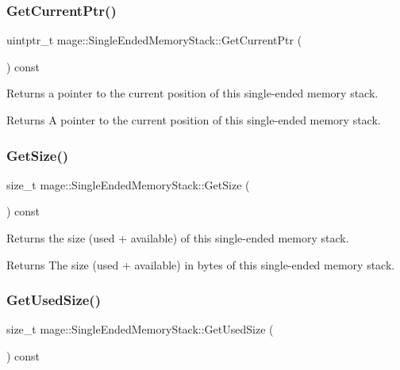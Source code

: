 \subsubsection{\texorpdfstring{Get\+Current\+Ptr()}{GetCurrentPtr()}}
{\footnotesize\ttfamily uintptr\+\_\+t mage\+::\+Single\+Ended\+Memory\+Stack\+::\+Get\+Current\+Ptr (\begin{DoxyParamCaption}{ }\end{DoxyParamCaption}) const\hspace{0.3cm}{\ttfamily [noexcept]}}

Returns a pointer to the current position of this single-\/ended memory stack.

\begin{DoxyReturn}{Returns}
A pointer to the current position of this single-\/ended memory stack. 
\end{DoxyReturn}
\hypertarget{classmage_1_1_single_ended_memory_stack_aa1df0adf194d6c2bb6c7597a96c10e61}{}\label{classmage_1_1_single_ended_memory_stack_aa1df0adf194d6c2bb6c7597a96c10e61} 
\subsubsection{\texorpdfstring{Get\+Size()}{GetSize()}}
{\footnotesize\ttfamily size\+\_\+t mage\+::\+Single\+Ended\+Memory\+Stack\+::\+Get\+Size (\begin{DoxyParamCaption}{ }\end{DoxyParamCaption}) const\hspace{0.3cm}{\ttfamily [noexcept]}}

Returns the size (used + available) of this single-\/ended memory stack.

\begin{DoxyReturn}{Returns}
The size (used + available) in bytes of this single-\/ended memory stack. 
\end{DoxyReturn}
\hypertarget{classmage_1_1_single_ended_memory_stack_ab2b07a4cf2c9eb9988ad49174e0804ac}{}\label{classmage_1_1_single_ended_memory_stack_ab2b07a4cf2c9eb9988ad49174e0804ac} 
\subsubsection{\texorpdfstring{Get\+Used\+Size()}{GetUsedSize()}}
{\footnotesize\ttfamily size\+\_\+t mage\+::\+Single\+Ended\+Memory\+Stack\+::\+Get\+Used\+Size (\begin{DoxyParamCaption}{ }\end{DoxyParamCaption}) const\hspace{0.3cm}{\ttfamily [noexcept]}}

